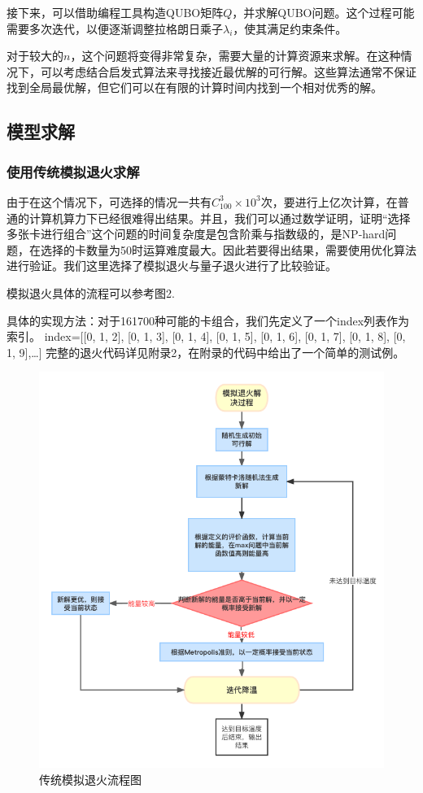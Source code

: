 \documentclass{MathorCupmodeling}
\begin{document}
接下来，可以借助编程工具构造QUBO矩阵$Q$，并求解QUBO问题。这个过程可能需要多次迭代，以便逐渐调整拉格朗日乘子$\lambda_i$，使其满足约束条件。

对于较大的$n$，这个问题将变得非常复杂，需要大量的计算资源来求解。在这种情况下，可以考虑结合启发式算法来寻找接近最优解的可行解。这些算法通常不保证找到全局最优解，但它们可以在有限的计算时间内找到一个相对优秀的解。
\subsection{模型求解}
\subsubsection{使用传统模拟退火求解}
由于在这个情况下，可选择的情况一共有$C_{100}^{3}\times10^{3}$次，要进行上亿次计算，在普通的计算机算力下已经很难得出结果。并且，我们可以通过数学证明，证明“选择多张卡进行组合”这个问题的时间复杂度是包含阶乘与指数级的，是NP-hard问题，在选择的卡数量为50时运算难度最大。因此若要得出结果，需要使用优化算法进行验证。我们这里选择了模拟退火与量子退火进行了比较验证。

模拟退火具体的流程可以参考图2.

具体的实现方法：对于161700种可能的卡组合，我们先定义了一个index列表作为索引。
index=[[0, 1, 2],
 [0, 1, 3],
 [0, 1, 4],
 [0, 1, 5],
 [0, 1, 6],
 [0, 1, 7],
 [0, 1, 8],
 [0, 1, 9],\dots]
完整的退火代码详见附录2，在附录的代码中给出了一个简单的测试例。
\begin{figure}[ht]
  \centering
  \includegraphics[width= 0.8\linewidth]{figure/sa.png}
  \caption{传统模拟退火流程图}
  \label{fig:my_label}
\end{figure}
\end{document}
